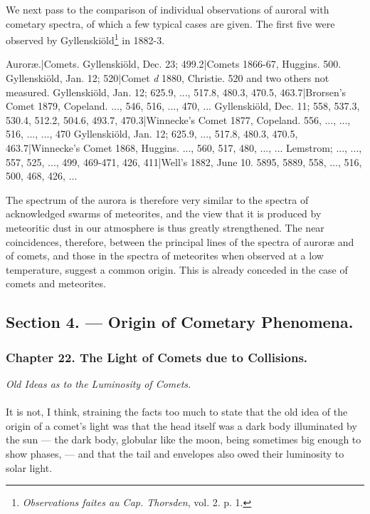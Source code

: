 \documentclass[a4paper, 12pt, oneside, polutonikogreek, english]{article}
\begin{document}
We next pass to the comparison of individual observations of auroral with cometary spectra, of which a few typical cases are given. The first five were observed by Gyllenskiöld\footnote{\emph{Observations faites au Cap. Thorsden}, vol. 2. p. 1.} in 1882-3.

Auroræ.|Comets. 
Gyllenskiöld, Dec. 23; 499.2|Comets 1866-67, Huggins. 500. 
Gyllenskiöld, Jan. 12; 520|Comet \emph{d} 1880, Christie. 520 and two others not measured. 
Gyllenskiöld, Jan. 12; 625.9, ..., 517.8, 480.3, 470.5, 463.7|Brorsen's Comet 1879, Copeland. ..., 546, 516, ..., 470, ... 
Gyllenskiöld, Dec. 11; 558, 537.3, 530.4, 512.2, 504.6, 493.7, 470.3|Winnecke's Comet 1877, Copeland. 556, ..., ..., 516, ..., ..., 470 
Gyllenskiöld, Jan. 12; 625.9, ..., 517.8, 480.3, 470.5, 463.7|Winnecke's Comet 1868, Huggins. ..., 560, 517, 480, ..., ... 
Lemstrom; ..., ..., 557, 525, ..., 499, 469-471, 426, 411|Well's 1882, June 10. 5895, 5889, 558, ..., 516, 500, 468, 426, ...

The spectrum of the aurora is therefore very similar to the spectra of acknowledged swarms of meteorites, and the view that it is produced by meteoritic dust in our atmosphere is thus greatly strengthened. The near coincidences, therefore, between the principal lines of the spectra of auroræ and of comets, and those in the spectra of meteorites when observed at a low temperature, suggest a common origin. This is already conceded in the case of comets and meteorites.
\clearpage
\subsection{Section 4. --- Origin of Cometary Phenomena.}
\subsubsection{Chapter 22. The Light of Comets due to Collisions.}
\begin{center}
\emph{Old Ideas as to the Luminosity of Comets.}
\end{center}
\paragraph{}
It is not, I think, straining the facts too much to state that the old idea of the origin of a comet's light was that the head itself was a dark body illuminated by the sun --- the dark body, globular like the moon, being sometimes big enough to show phases, --- and that the tail and envelopes also owed their luminosity to solar light.
\end{document}
